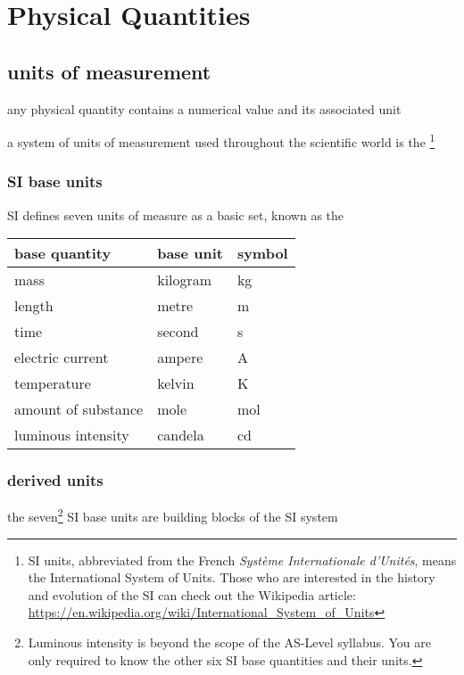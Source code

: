 \section{Physical Quantities}

\subsection{units of measurement}

any physical quantity contains a numerical value and its associated unit

a system of units of measurement used throughout the scientific world is the \footnote{SI units, abbreviated from the French \emph{Syst\`eme Internationale d'Unit\'es}, means the International System of Units. Those who are interested in the history and evolution of the SI can check out the Wikipedia article: \url{https://en.wikipedia.org/wiki/International_System_of_Units}}

\subsubsection{SI base units}

SI defines seven units of measure as a basic set, known as the 

\begin{center}
	\begin{tabular}{|C{5.4cm}|C{3cm}|C{3cm}|}
		\hline base quantity & base unit & symbol  \\ 
		\hline mass  & kilogram & kg \\ 
		\hline length & metre & m \\ 
		\hline time & second & s \\ 
		\hline electric current  & ampere & A \\ 
		\hline temperature & kelvin & K \\ 
		\hline amount of substance & mole & mol \\ 
		\hline luminous intensity & candela & cd \\ 
		\hline 
	\end{tabular} 
\end{center}


\subsubsection{derived units}

the seven\footnote{Luminous intensity is beyond the scope of the AS-Level syllabus. You are only required to know the other six SI base quantities and their units.} SI base units are building blocks of the SI system

